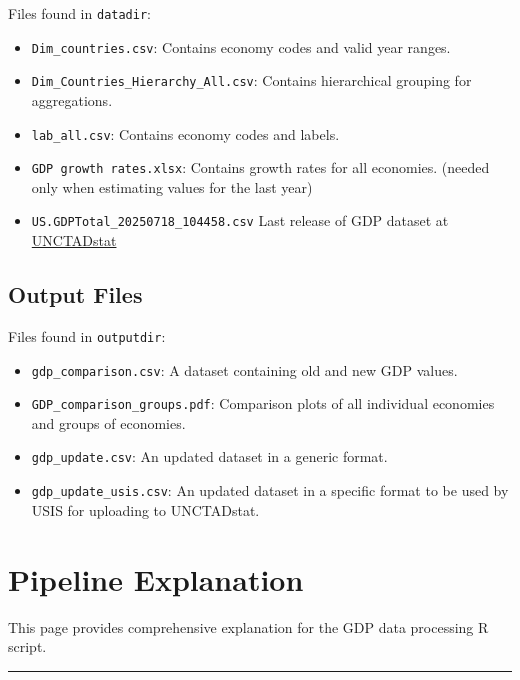 \documentclass[
]{book}
\providecommand{\tightlist}{%
  \setlength{\itemsep}{0pt}\setlength{\parskip}{0pt}}
\begin{document}
Files found in \texttt{datadir}:

\begin{itemize}
\tightlist
\item
  \texttt{Dim\_countries.csv}: Contains economy codes and valid year ranges.
\item
  \texttt{Dim\_Countries\_Hierarchy\_All.csv}: Contains hierarchical grouping for aggregations.
\item
  \texttt{lab\_all.csv}: Contains economy codes and labels.
\item
  \texttt{GDP\ growth\ rates.xlsx}: Contains growth rates for all economies. (needed only when estimating values for the last year)
\item
  \texttt{US.GDPTotal\_20250718\_104458.csv} Last release of GDP dataset at \href{https://unctadstat.unctad.org/datacentre/dataviewer/US.GDPTotal}{UNCTADstat}
\end{itemize}

\section*{Output Files}\label{output-files}

Files found in \texttt{outputdir}:

\begin{itemize}
\tightlist
\item
  \texttt{gdp\_comparison.csv}: A dataset containing old and new GDP values.
\item
  \texttt{GDP\_comparison\_groups.pdf}: Comparison plots of all individual economies and groups of economies.
\item
  \texttt{gdp\_update.csv}: An updated dataset in a generic format.
\item
  \texttt{gdp\_update\_usis.csv}: An updated dataset in a specific format to be used by USIS for uploading to UNCTADstat.
\end{itemize}

\chapter{Pipeline Explanation}\label{pipeline-explanation}

This page provides comprehensive explanation for the GDP data processing R script.

\begin{center}\rule{0.5\linewidth}{0.5pt}\end{center}
\end{document}
